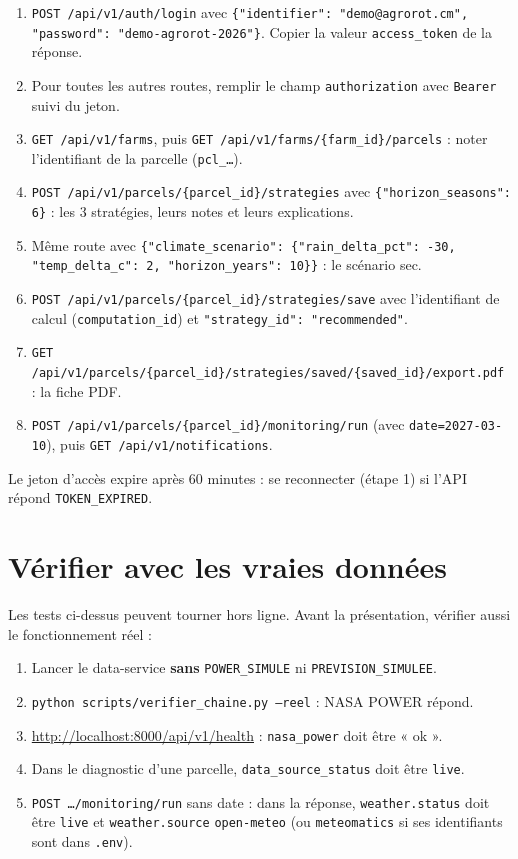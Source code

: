 \documentclass[11pt,a4paper]{article}
\begin{document}
\begin{enumerate}
\item \texttt{POST /api/v1/auth/login} avec \texttt{\{"identifier": "demo@agrorot.cm", "password": "demo-agrorot-2026"\}}.
Copier la valeur \texttt{access\_token} de la réponse.
\item Pour toutes les autres routes, remplir le champ \texttt{authorization} avec \texttt{Bearer } suivi du jeton.
\item \texttt{GET /api/v1/farms}, puis \texttt{GET /api/v1/farms/\{farm\_id\}/parcels} : noter l'identifiant de la parcelle (\texttt{pcl\_…}).
\item \texttt{POST /api/v1/parcels/\{parcel\_id\}/strategies} avec \texttt{\{"horizon\_seasons": 6\}} : les 3 stratégies, leurs notes et leurs explications.
\item Même route avec \texttt{\{"climate\_scenario": \{"rain\_delta\_pct": -30, "temp\_delta\_c": 2, "horizon\_years": 10\}\}} : le scénario sec.
\item \texttt{POST /api/v1/parcels/\{parcel\_id\}/strategies/save} avec l'identifiant de calcul (\texttt{computation\_id}) et \texttt{"strategy\_id": "recommended"}.
\item \texttt{GET /api/v1/parcels/\{parcel\_id\}/strategies/saved/\{saved\_id\}/export.pdf} : la fiche PDF.
\item \texttt{POST /api/v1/parcels/\{parcel\_id\}/monitoring/run} (avec \texttt{date=2027-03-10}), puis \texttt{GET /api/v1/notifications}.
\end{enumerate}

Le jeton d'accès expire après 60 minutes : se reconnecter (étape 1) si l'API répond \texttt{TOKEN\_EXPIRED}.

\section{Vérifier avec les vraies données}

Les tests ci-dessus peuvent tourner hors ligne. Avant la présentation, vérifier aussi le fonctionnement réel :

\begin{enumerate}
\item Lancer le data-service \textbf{sans} \texttt{POWER\_SIMULE} ni \texttt{PREVISION\_SIMULEE}.
\item \texttt{python scripts/verifier\_chaine.py --reel} : NASA POWER répond.
\item \url{http://localhost:8000/api/v1/health} : \texttt{nasa\_power} doit être « ok ».
\item Dans le diagnostic d'une parcelle, \texttt{data\_source\_status} doit être \texttt{live}.
\item \texttt{POST …/monitoring/run} sans date : dans la réponse, \texttt{weather.status} doit être \texttt{live} et
\texttt{weather.source} \texttt{open-meteo} (ou \texttt{meteomatics} si ses identifiants sont dans \texttt{.env}).
\end{enumerate}
\end{document}
